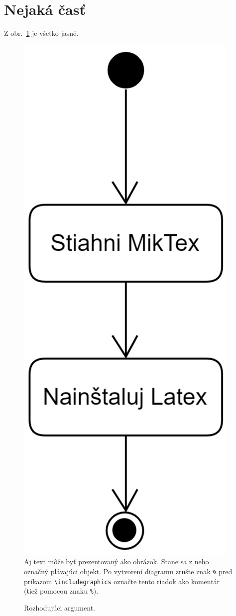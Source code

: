 \documentclass[10pt,twoside,slovak,a4paper]{article}
\begin{document}
\section{Nejaká časť}\label{nejaka}

Z obr.~\ref{f:rozhod} je všetko jasné. 

\begin{figure}[tbh]
\centering
\includegraphics[scale=1.0]{diagram.pdf}
Aj text môže byť prezentovaný ako obrázok. Stane sa z neho označný plávajúci objekt. Po vytvorení diagramu zrušte znak \texttt{\%} pred príkazom \verb|\includegraphics| označte tento riadok ako komentár (tiež pomocou znaku \texttt{\%}).
\caption{Rozhodujúci argument.}\label{f:rozhod}
\end{figure}
\end{document}
